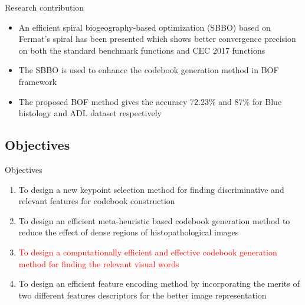 \documentclass [9pt,times] {beamer}
\begin{document}
\begin{frame}{Research contribution}
\begin{itemize}
	\justifying
	\item An efficient spiral biogeography-based optimization (SBBO) based on Fermat's spiral has been presented which shows better convergence precision on both the standard benchmark functions and CEC 2017 functions\\[3ex]

\item The SBBO is used to enhance the codebook generation method in BOF framework \\[3ex]

\item The proposed BOF method gives the accuracy 72.23\% and 87\% for Blue histology and ADL dataset respectively 
\end{itemize}
\end{frame}


\subsection{Objectives}
\begin{frame}{Objectives}
\begin{enumerate}
	\justifying
	\item To design a new keypoint selection method for finding discriminative and relevant features for codebook construction \\[3ex]

	\item To design an efficient meta-heuristic based codebook generation method to reduce the effect of dense regions of histopathological images \\[3ex]
	
	\item \textcolor{red}{To design a computationally efficient and effective codebook generation method for finding the relevant visual words} \\[3ex]

	\item To design an efficient feature encoding method by incorporating the merits of two different features descriptors for the better image representation
	
\end{enumerate}
\end{frame}
\end{document}
